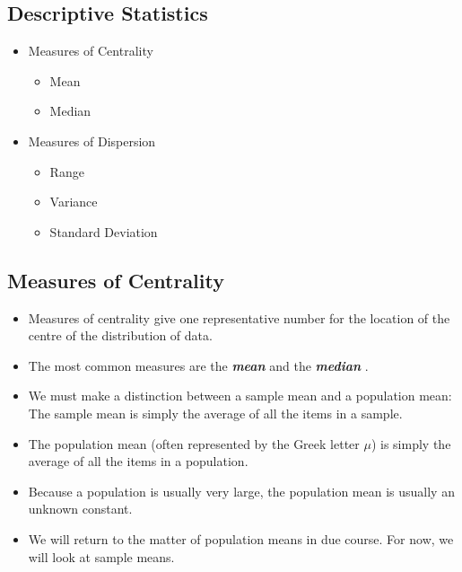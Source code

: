 \documentclass[]{report}
\begin{document}
{

\subsection{Descriptive Statistics}

\begin{itemize}
\item Measures of Centrality
\begin{itemize}
\item Mean
\item Median
\end{itemize}
\item Measures of Dispersion
\begin{itemize}
\item Range
\item Variance
\item Standard Deviation
\end{itemize}
\end{itemize}

}
{
\subsection{Measures of Centrality}

\begin{itemize}
\item Measures of centrality give one representative number for the location of the centre of the distribution of data.
\item
The most common measures are the \textbf{\emph{mean}} and the \textbf{\emph{ median }}.
\item We must make a distinction between a sample mean and a population mean: The sample mean is simply the average of all the items in a sample.  \item The population mean (often represented by the Greek letter $\mu$) is simply the average of all the items in a population. \item Because a population is usually very large, the population mean is usually an unknown constant.
\item We will return to the matter of population means in due course. For now, we will look at sample means.
\end{itemize}

}
\end{document}
